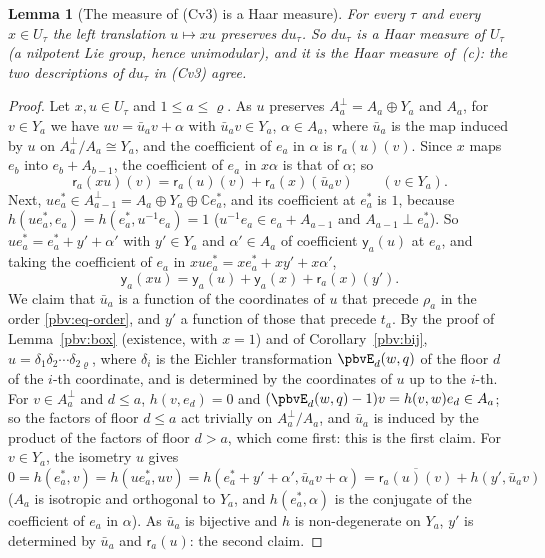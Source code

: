 \documentclass[10pt]{amsart}
\newtheorem{lemma}[theorem]{Lemma}
\theoremstyle{definition}
\theoremstyle{remark}
\newcommand{\C}{\mathbb C}
\providecommand{\aubar}[1]{\overline{#1}}
\begin{document}
\begin{lemma}[The measure of \textup{(Cv3)} is a Haar measure]\label{pbv:haar}
For every $\tau$ and every $x\in U_\tau$ the left translation $u\mapsto xu$ preserves $du_\tau$. So $du_\tau$
is a Haar measure of $U_\tau$ (a nilpotent Lie group, hence unimodular), and it is the Haar measure of
{\cite[Lemma~4.1]{P52}}\,\textup{(c)}: the two descriptions of $du_\tau$ in \textup{(Cv3)} agree.
\end{lemma}
\begin{proof}
Let $x,u\in U_\tau$ and $1\le a\le\varrho$. As $u$ preserves $A_a^\perp=A_a\oplus Y_a$ and $A_a$, for $v\in Y_a$
we have $uv=\bar u_av+\alpha$ with $\bar u_av\in Y_a$, $\alpha\in A_a$, where $\bar u_a$ is the map induced by
$u$ on $A_a^\perp/A_a\cong Y_a$, and the coefficient of $e_a$ in $\alpha$ is $\mathsf r_a(u)(v)$. Since $x$ maps
$e_b$ into $e_b+A_{b-1}$, the coefficient of $e_a$ in $x\alpha$ is that of $\alpha$; so
\begin{equation}\label{pbv:eq-left1}
\mathsf r_a(xu)(v)=\mathsf r_a(u)(v)+\mathsf r_a(x)(\bar u_av)\qquad(v\in Y_a).
\end{equation}
Next, $ue_a^*\in A_{a-1}^\perp=A_a\oplus Y_a\oplus\C e_a^*$, and its coefficient at $e_a^*$ is $1$, because
$h(ue_a^*,e_a)=h(e_a^*,u^{-1}e_a)=1$ ($u^{-1}e_a\in e_a+A_{a-1}$ and $A_{a-1}\perp e_a^*$). So $ue_a^*=e_a^*+y'+
\alpha'$ with $y'\in Y_a$ and $\alpha'\in A_a$ of coefficient $\mathsf y_a(u)$ at $e_a$, and taking the
coefficient of $e_a$ in $xue_a^*=xe_a^*+xy'+x\alpha'$,
\begin{equation}\label{pbv:eq-left2}
\mathsf y_a(xu)=\mathsf y_a(u)+\mathsf y_a(x)+\mathsf r_a(x)(y').
\end{equation}
We claim that $\bar u_a$ is a function of the coordinates of $u$ that precede $\rho_a$ in the order
\eqref{pbv:eq-order}, and $y'$ a function of those that precede $t_a$. By the proof of
Lemma~\ref{pbv:box} (existence, with $x=1$) and of Corollary~\ref{pbv:bij}, $u=\delta_1\delta_2\cdots\delta_{2\varrho}$,
where $\delta_i$ is the Eichler transformation $\pbvE_d(w,q)$ of the floor $d$ of the $i$-th coordinate, and
is determined by the coordinates of $u$ up to the $i$-th. For $v\in A_a^\perp$ and $d\le a$, $h(v,e_d)=0$ and
$(\pbvE_d(w,q)-1)v=h(v,w)e_d\in A_a$; so the factors of floor $d\le a$ act trivially on $A_a^\perp/A_a$, and
$\bar u_a$ is induced by the product of the factors of floor $d>a$, which come first: this is the first
claim. For $v\in Y_a$, the isometry $u$ gives $0=h(e_a^*,v)=h(ue_a^*,uv)=h(e_a^*+y'+\alpha',\bar u_av+\alpha)=
\aubar{\mathsf r_a(u)(v)}+h(y',\bar u_av)$ ($A_a$ is isotropic and orthogonal to $Y_a$, and $h(e_a^*,\alpha)$ is
the conjugate of the coefficient of $e_a$ in $\alpha$). As $\bar u_a$ is bijective and $h$ is non-degenerate
on $Y_a$, $y'$ is determined by $\bar u_a$ and $\mathsf r_a(u)$: the second claim.


\end{proof}
\end{document}
